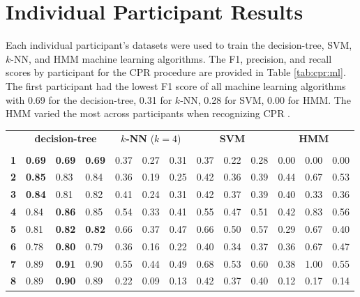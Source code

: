 \section{Individual Participant Results}
\label{sec:Results:Individual}

Each individual participant's datasets were used to train the decision-tree, SVM, $k$-NN, and HMM machine learning algorithms. The F1, precision, and recall scores by participant for the CPR procedure are provided in Table \ref{tab:cpr:ml}. The first participant had the lowest F1 score of all machine learning algorithms with 0.69 for the decision-tree, 0.31 for $k$-NN, 0.28 for SVM, 0.00 for HMM. The HMM varied the most across participants when recognizing CPR .
\newcommand*\rotv{\multirow{2}{*}{\rotatebox[origin=c]{45}}}
\begin{table}[h]
	\centering
	\begin{tabular}{lllllllllllll}
		\multirow{2}{*}{\rotatebox[origin=c]{45}{\textbf{Participant}}} & \multicolumn{3}{c}{\textbf{decision-tree}} & \multicolumn{3}{c}{\textbf{$k$-NN} ($k=4$)} & \multicolumn{3}{c}{\textbf{SVM}} & \multicolumn{3}{c}{\textbf{HMM}} \\
		& \rot{Precision}     & \rot{Recall}    & \rot{F1}    & \rot{Precision}     & \rot{Recall}    & \rot{F1}  & \rot{Precision}     & \rot{Recall}    & \rot{F1} & \rot{Precision}     & \rot{Recall}    & \rot{F1} \\
		\textbf{1}   & \textbf{0.69} & \textbf{0.69} & \textbf{0.69} & 0.37 & 0.27 & 0.31 & 0.37 & 0.22 & 0.28 & 0.00 & 0.00 & 0.00 \\
		\textbf{2}   & \textbf{0.85} & 0.83 & 0.84 & 0.36 & 0.19 & 0.25 & 0.42 & 0.36 & 0.39 & 0.44 & 0.67 & 0.53 \\
		\textbf{3}   & \textbf{0.84} & 0.81 & 0.82 & 0.41 & 0.24 & 0.31 & 0.42 & 0.37 & 0.39 & 0.40 & 0.33 & 0.36 \\
		\textbf{4}   & 0.84 & \textbf{0.86} & 0.85 & 0.54 & 0.33 & 0.41 & 0.55 & 0.47 & 0.51 & 0.42 & 0.83 & 0.56 \\
		\textbf{5}   & 0.81 & \textbf{0.82} & \textbf{0.82} & 0.66 & 0.37 & 0.47 & 0.66 & 0.50 & 0.57 & 0.29 & 0.67 & 0.40 \\
		\textbf{6}   & 0.78 & \textbf{0.80} & 0.79 & 0.36 & 0.16 & 0.22 & 0.40 & 0.34 & 0.37 & 0.36 & 0.67 & 0.47 \\
		\textbf{7}   & 0.89 & \textbf{0.91} & 0.90 & 0.55 & 0.44 & 0.49 & 0.68 & 0.53 & 0.60 & 0.38 & 1.00 & 0.55 \\
		\textbf{8}   & 0.89 & \textbf{0.90} & 0.89 & 0.22 & 0.09 & 0.13 & 0.42 & 0.37 & 0.40 & 0.12 & 0.17 & 0.14 \\

\end{tabular}
\end{table}
